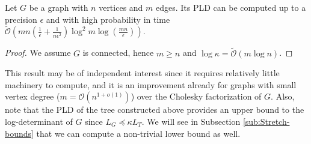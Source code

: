 \begin{theorem} \label{thm:PLD-tree}Let $G$ be a graph with $n$
vertices and $m$ edges. Its PLD can be computed up to a precision $\epsilon$ and with high probability in time $\tilde{\mathcal{O}}\left(mn\left(\frac{1}{\epsilon}+\frac{1}{n\epsilon^{2}}\right)\log^2 m \log (\frac{mn}{\epsilon})\right)$.\end{theorem}

\begin{proof} We assume $G$ is connected, hence $m\geq n$ and $\log\kappa=\tilde{\mathcal{O}}\left(m\log n\right)$.
\end{proof}

This result may be of independent interest since it requires relatively
little machinery to compute, and it is an improvement already for
graphs with small vertex degree ($m=\mathcal{O}\left(n^{1+o\left(1\right)}\right)$)
over the Cholesky factorization of $G$. Also, note that the PLD of
the tree constructed above provides an upper bound to the log-determinant
of $G$ since $L_{G}\preceq \kappa L_{T}$. We will see in Subsection \ref{sub:Stretch-bounds}
that we can compute a non-trivial lower bound as well.
